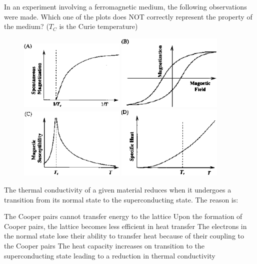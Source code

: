 \documentclass{exam}
\begin{document}
\begin{questions}
\question In an experiment involving a ferromagnetic medium, the following observations were made. Which one of the plots does NOT correctly represent the property of the medium? ($T_C$ is the Curie temperature)\hfill{}
\begin{figure}[H]
	\centering
	\includegraphics[width=0.45\textwidth]{pics/9a.png}
	\includegraphics[width=0.45\textwidth]{pics/9b.png}
	\includegraphics[width=0.45\textwidth]{pics/9c.png}
	\includegraphics[width=0.45\textwidth]{pics/9d.png}
\end{figure}

\question The thermal conductivity of a given material reduces when it undergoes a transition from its normal state to the superconducting state. The reason is:\hfill{}

\begin{choices}
	\choice The Cooper pairs cannot transfer energy to the lattice
	\choice Upon the formation of Cooper pairs, the lattice becomes less efficient in heat transfer
	\choice The electrons in the normal state lose their ability to transfer heat because of their coupling to the Cooper pairs
	\choice The heat capacity increases on transition to the superconducting state leading to a reduction in thermal conductivity
\end{choices}


\end{questions}
\end{document}
